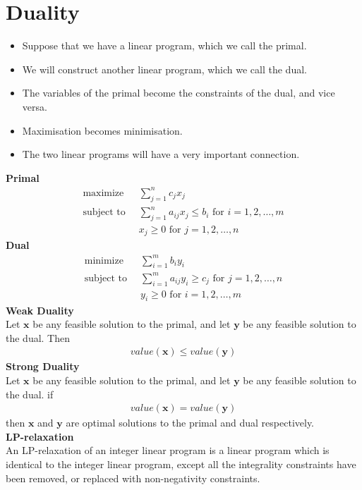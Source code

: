 \documentclass[onecolumn]{report}
\begin{document}
\section{Duality}
\begin{itemize}
    \item Suppose that we have a linear program, which we call the primal.
    \item We will construct another linear program, which we call the dual.
    \item The variables of the primal become the constraints of the dual, and vice versa.
    \item Maximisation becomes minimisation.
    \item The two linear programs will have a very important connection.
\end{itemize}
\textbf{Primal}
\begin{align*}
    \text{maximize  } \:& \sum_{j=1}^n c_jx_j\\
    \text{subject to  } \:& \sum_{j=1}^n a_{ij}x_j \leq b_i \text{ for } i=1, 2, \dots, m\\
    & x_j \geq 0 \text{ for } j=1, 2, \dots, n
\end{align*}
\textbf{Dual}
\begin{align*}
    \text{minimize  } \:& \sum_{i=1}^m b_iy_i\\
    \text{subject to  } \:& \sum_{i=1}^m a_{ij}y_i \geq c_j \text{ for } j=1, 2, \dots, n\\
    & y_i \geq 0 \text{ for } i=1, 2, \dots, m
\end{align*}
\noindent
\textbf{Weak Duality}\\
Let $\mathbf{x}$ be any feasible solution to the primal, and let $\mathbf{y}$ be any feasible solution to the dual. Then
\begin{align*}
    value(\mathbf{x}) \leq value(\mathbf{y})
\end{align*}
\textbf{Strong Duality}\\
Let $\mathbf{x}$ be any feasible solution to the primal, and let $\mathbf{y}$ be any feasible solution to the dual. if 
\begin{align*}
    value(\mathbf{x}) = value(\mathbf{y})
\end{align*}
then $\mathbf{x}$ and $\mathbf{y}$ are optimal solutions to the primal and dual respectively.\\
\noindent
\textbf{LP-relaxation}\\
An LP-relaxation of an integer linear program is a linear program which is identical to the integer linear program, except all the integrality constraints have been removed, or replaced with non-negativity constraints.\\
\end{document}
